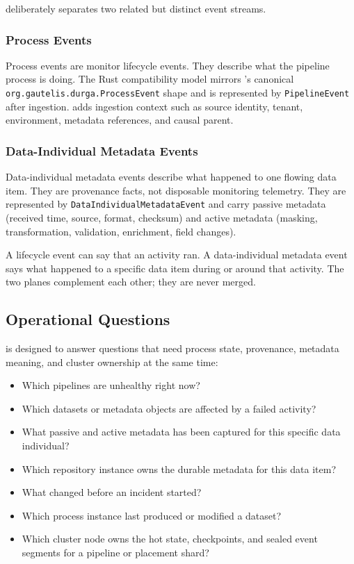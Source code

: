 \vannak{} deliberately separates two related but distinct event streams.

\subsubsection{Process Events}

Process events are \durga{} monitor lifecycle events. They describe what the
pipeline process is doing. The Rust compatibility model mirrors \durga{}'s
canonical \texttt{org.gautelis.durga.ProcessEvent} shape and is represented by
\texttt{PipelineEvent} after ingestion. \vannak{} adds ingestion context such
as source identity, tenant, environment, metadata references, and causal parent.

\subsubsection{Data-Individual Metadata Events}

Data-individual metadata events describe what happened to one flowing data item.
They are provenance facts, not disposable monitoring telemetry. They are
represented by \texttt{DataIndividualMetadataEvent} and carry passive metadata
(received time, source, format, checksum) and active metadata (masking,
transformation, validation, enrichment, field changes).

\begin{vnote}
A \durga{} lifecycle event can say that an activity ran. A data-individual
metadata event says what happened to a specific data item during or around that
activity. The two planes complement each other; they are never merged.
\end{vnote}

\subsection{Operational Questions}

\vannak{} is designed to answer questions that need process state, provenance,
metadata meaning, and cluster ownership at the same time:

\begin{itemize}
\item Which pipelines are unhealthy right now?
\item Which datasets or metadata objects are affected by a failed activity?
\item What passive and active metadata has been captured for this specific data
  individual?
\item Which \ipto{} repository instance owns the durable metadata for this data
  item?
\item What changed before an incident started?
\item Which process instance last produced or modified a dataset?
\item Which cluster node owns the hot state, checkpoints, and sealed event
  segments for a pipeline or placement shard?
\end{itemize}

